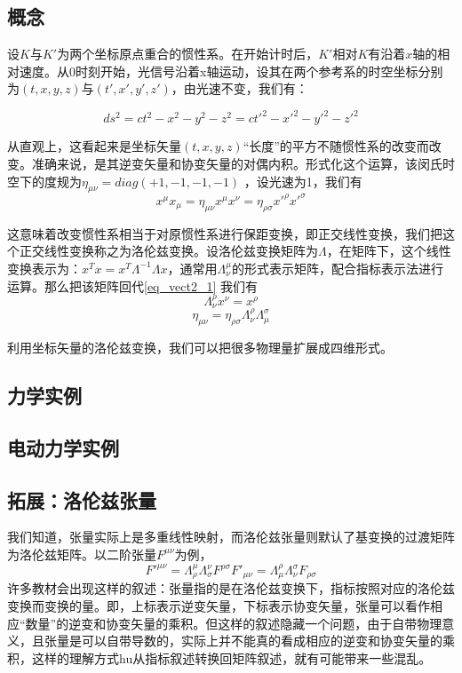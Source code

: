 \subsection{概念}
设$K$与$K'$为两个坐标原点重合的惯性系。在开始计时后，$K'$相对$K$有沿着$x$轴的相对速度。从$0$时刻开始，光信号沿着x轴运动，设其在两个参考系的时空坐标分别为$(t,x,y,z)$与$(t',x',y',z')$，由光速不变，我们有：

$$ds^2=ct^2-x^2-y^2-z^2=ct'^2-x'^2-y'^2-z'^2$$

从直观上，这看起来是坐标矢量$(t,x,y,z)$“长度”的平方不随惯性系的改变而改变。准确来说，是其逆变矢量和协变矢量的对偶内积。形式化这个运算，该闵氏时空下的度规为$\eta_{\mu\nu}=diag(+1,-1,-1,-1) $ ，设光速为1，我们有
\begin{equation}\label{eq_vect2_1}
x^\mu x_\mu =\eta_{\mu\nu}x^\mu x^\nu=\eta_{\rho \sigma}x'^\rho x'^\sigma   
\end{equation}

这意味着改变惯性系相当于对原惯性系进行保距变换，即正交线性变换，我们把这个正交线性变换称之为洛伦兹变换。设洛伦兹变换矩阵为$\Lambda$，在矩阵下，这个线性变换表示为：$x^T x=x^T\Lambda^{-1}\Lambda x$，通常用$\Lambda^\mu_\nu $的形式表示矩阵，配合指标表示法进行运算。那么把该矩阵回代\autoref{eq_vect2_1} 我们有
\begin{equation}
\Lambda^\rho_\nu x^\nu=x^\rho
\end{equation}
\begin{equation}
\eta_{\mu\nu}=\eta_{\rho \sigma}\Lambda^\rho_\nu \Lambda^\sigma_\mu 
\end{equation}

利用坐标矢量的洛伦兹变换，我们可以把很多物理量扩展成四维形式。
\subsection{力学实例}
\subsection{电动力学实例}
\subsection{拓展：洛伦兹张量}
我们知道，张量实际上是多重线性映射，而洛伦兹张量则默认了基变换的过渡矩阵为洛伦兹矩阵。以二阶张量$F^{\mu\nu} $为例，
\begin{equation}
F'^{\mu\nu}=\Lambda_\rho^\mu \Lambda_\sigma^\nu F^{\rho\sigma}
F'_{\mu\nu}=\Lambda_\mu^\rho \Lambda_\nu^\sigma F_{\rho\sigma}
\end{equation}
许多教材会出现这样的叙述：张量指的是在洛伦兹变换下，指标按照对应的洛伦兹变换而变换的量。即，上标表示逆变矢量，下标表示协变矢量，张量可以看作相应“数量”的逆变和协变矢量的乘积。但这样的叙述隐藏一个问题，由于自带物理意义，且张量是可以自带导数的，实际上并不能真的看成相应的逆变和协变矢量的乘积，这样的理解方式hu从指标叙述转换回矩阵叙述，就有可能带来一些混乱。

